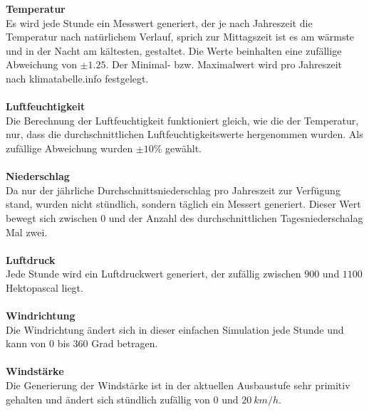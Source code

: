 \textbf{Temperatur}\\
Es wird jede Stunde ein Messwert generiert, der je nach Jahreszeit die Temperatur nach natürlichem Verlauf, sprich zur Mittagszeit ist es am wärmste und in der Nacht am kältesten, gestaltet. Die Werte beinhalten eine zufällige Abweichung von $\pm 1.25$. Der Minimal- bzw. Maximalwert wird pro Jahreszeit nach klimatabelle.info festgelegt.~\\~\\ %

\textbf{Luftfeuchtigkeit}\\
Die Berechnung der Luftfeuchtigkeit funktioniert gleich, wie die der Temperatur, nur, dass die durchschnittlichen Luftfeuchtigkeitswerte hergenommen wurden. Als zufällige Abweichung wurden $\pm10\%$ gewählt.~\\~\\ %

\textbf{Niederschlag}\\
Da nur der jährliche Durchschnittsniederschlag pro Jahreszeit zur Verfügung stand, wurden nicht stündlich, sondern täglich ein Messert generiert. Dieser Wert bewegt sich zwischen $0$ und der Anzahl des durchschnittlichen Tagesniederschalag Mal zwei.~\\~\\ %

\textbf{Luftdruck}\\
Jede Stunde wird ein Luftdruckwert generiert, der zufällig zwischen $900$ und $1100$ Hektopascal liegt.~\\~\\ %

\textbf{Windrichtung}\\
Die Windrichtung ändert sich in dieser einfachen Simulation jede Stunde und kann von $0$ bis $360$ Grad betragen.~\\~\\ %

\textbf{Windstärke}\\
Die Generierung der Windstärke ist in der aktuellen Ausbaustufe sehr primitiv gehalten und ändert sich stündlich zufällig von $0$ und $20\ km/h$.


\newpage
